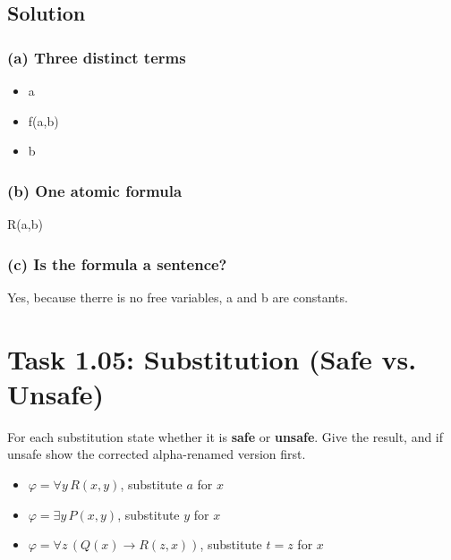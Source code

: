 \documentclass[11pt,a4paper]{article}
\newenvironment{solution}{%
    \begin{tcolorbox}[
        breakable,
        colback=green!4,
        colframe=green!50!black,
        fonttitle=\bfseries,
        title={ Solution},
        left=6pt, right=6pt, top=4pt, bottom=4pt
    ]%
    }{%
    \end{tcolorbox}%
}
\begin{document}
    \subsection*{Solution}
    \begin{solution}
        \subsubsection*{(a) Three distinct terms}
        \begin{itemize}
            \item a
            \item f(a,b)
            \item b
        \end{itemize}

        \subsubsection*{(b) One atomic formula}
        R(a,b)

        \subsubsection*{(c) Is the formula a sentence?}
        Yes, because therre is no free variables, a and b are constants.
    \end{solution}

    \section*{Task 1.05: Substitution (Safe vs. Unsafe)}

    For each substitution state whether it is \textbf{safe} or \textbf{unsafe}. Give the result, and if unsafe show the corrected alpha-renamed version first.

    \begin{itemize}[itemindent=1em]
        \item $\varphi = \forall y\, R(x,y)$, substitute $a$ for $x$
        \item $\varphi = \exists y\, P(x,y)$, substitute $y$ for $x$
        \item $\varphi = \forall z\,(Q(x) \to R(z,x))$, substitute $t = z$ for $x$
    \end{itemize}
\end{document}
